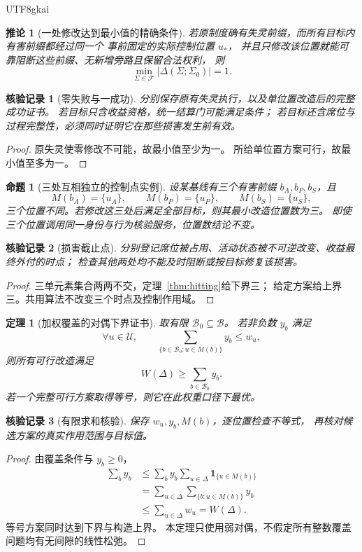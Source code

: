 \documentclass[12pt,a4paper,openany]{report}
\newtheorem{theorem}{定理}[chapter]
\newtheorem{proposition}{命题}[chapter]
\newtheorem{corollary}{推论}[chapter]
\newtheorem{Certificate}{核验记录}[chapter]
\newcommand{\Ind}{\mathbf 1}
\begin{document}
\begin{CJK*}{UTF8}{gkai}
\begin{corollary}[一处修改达到最小值的精确条件]
\label{cor:one-gate}
若原制度确有失灵前缀，而所有目标内有害前缀都经过同一个
事前固定的实际控制位置 \(u_*\)，
并且只修改该位置就能可靠阻断这些前缀、无新增旁路且保留合法权利，
则
\[
\min_{\Sigma\in\mathcal F}|\Delta(\Sigma;\Sigma_0)|=1.
\]
\end{corollary}
\begin{Certificate}[零失败与一成功]
分别保存原有失灵执行，以及单位置改造后的完整成功证书。
若目标只含收益资格，统一结算门可能满足条件；
若目标还含席位与过程完整性，必须同时证明它在那些损害发生前有效。
\end{Certificate}
\begin{proof}
原失灵使零修改不可能，故最小值至少为一。
所给单位置方案可行，故最小值至多为一。
\end{proof}

\begin{proposition}[三处互相独立的控制点实例]
\label{prop:three-gates}
设某基线有三个有害前缀 \(b_A,b_P,b_S\)，且
\[
M(b_A)=\{u_A\},\qquad
M(b_P)=\{u_P\},\qquad
M(b_S)=\{u_S\},
\]
三个位置不同。若修改这三处后满足全部目标，则其最小改造位置数为三。
即使三个位置调用同一身份与行为核验服务，位置数结论不变。
\end{proposition}
\begin{Certificate}[损害截止点]
分别登记席位被占用、活动状态被不可逆改变、收益最终外付的时点；
检查其他两处均不能及时阻断或按目标修复该损害。
\end{Certificate}
\begin{proof}
三单元素集合两两不交，定理~\ref{thm:hitting}给下界三；
给定方案给上界三。共用算法不改变三个时点及控制作用域。
\end{proof}

\begin{theorem}[加权覆盖的对偶下界证书]
\label{thm:weighted}
取有限 \(\mathcal B_0\subseteq\mathcal B\)。
若非负数 \(y_b\) 满足
\[
\forall u\in\mathcal U,\qquad
\sum_{\{b\in\mathcal B_0:u\in M(b)\}}y_b\le w_u,
\]
则所有可行改造满足
\[
W(\Delta)\ge\sum_{b\in\mathcal B_0}y_b.
\]
若一个完整可行方案取得等号，则它在此权重口径下最优。
\end{theorem}
\begin{Certificate}[有限求和核验]
保存 \(w_u,y_b,M(b)\)，逐位置检查不等式，
再核对候选方案的真实作用范围与目标值。
\end{Certificate}
\begin{proof}
由覆盖条件与 \(y_b\ge0\)，
\[
\begin{aligned}
\sum_b y_b
&\le\sum_b y_b\sum_{u\in\Delta}\Ind_{\{u\in M(b)\}}\\
&=\sum_{u\in\Delta}\sum_{\{b:u\in M(b)\}}y_b\\
&\le\sum_{u\in\Delta}w_u=W(\Delta).
\end{aligned}
\]
等号方案同时达到下界与构造上界。
本定理只使用弱对偶，不假定所有整数覆盖问题均有无间隙的线性松弛。
\end{proof}


\end{CJK*}
\end{document}
